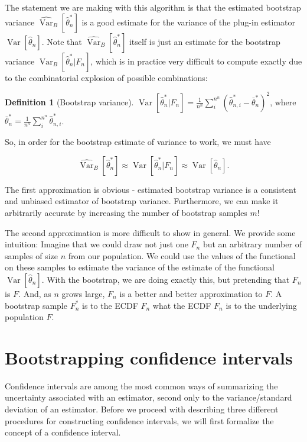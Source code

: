 \documentclass{book}
\theoremstyle{plain}%
\theoremstyle{definition}
\newtheorem{definition}{Definition}[section]
\DeclareMathOperator{\Var}{Var}
\begin{document}
The statement we are making with this algorithm is that the estimated bootstrap variance $\widehat{\Var}_B[\hat{\theta}^*_n]$ is a good estimate for the variance of the plug-in estimator $\Var[\hat{\theta}_n]$. Note that $\widehat{\Var}_B[\hat{\theta}^*_n]$ itself is just an estimate for the bootstrap variance $\Var_B[\hat{\theta}^*_n| F_n]$, which is in practice very difficult to compute exactly due to the combinatorial explosion of possible combinations:

\begin{definition}[Bootstrap variance]
$\Var[\hat{\theta}^*_n| F_n] = \frac{1}{n^n} \sum_{i}^{n^n}  \left(\hat{\theta}^*_{n,i} - \bar{\theta}^*_n\right)^2$, where $\bar{\theta}^*_n = \frac{1}{n^n} \sum_{i}^{n^n} \hat{\theta}^*_{n,i}$.
\end{definition}

So, in order for the bootstrap estimate of variance to work, we must have

$$\widehat{\Var}_B[\hat{\theta}^*_n] \approx \Var[\hat{\theta}^*_n| F_n] \approx \Var[\hat{\theta}_n].$$

The first approximation is obvious - estimated bootstrap variance is a consistent and unbiased estimator of bootstrap variance. Furthermore, we can make it arbitrarily accurate by increasing the number of bootstrap samples $m$!

The second approximation is more difficult to show in general. We provide some intuition: Imagine that we could draw not just one $F_n$ but an arbitrary number of samples of size $n$ from our population. We could use the values of the functional on these samples to estimate the variance of the estimate of the functional $\Var[\hat{\theta}_n]$. With the bootstrap, we are doing exactly this, but pretending that $F_n$ is $F$. And, as $n$ grows large, $F_n$ is a better and better approximation to $F$. A bootstrap sample $F^*_n$ is to the ECDF $F_n$ what the ECDF $F_n$ is to the underlying population $F$.



\section{Bootstrapping confidence intervals}

Confidence intervals are among the most common ways of summarizing the uncertainty associated with an estimator, second only to the variance/standard deviation of an estimator. Before we proceed with describing three different procedures for constructing confidence intervals, we will first formalize the concept of a confidence interval.
\end{document}
